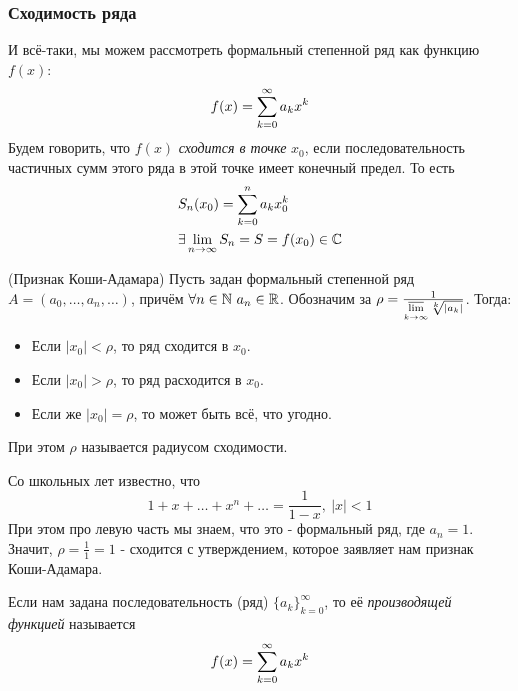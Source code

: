 \subsubsection*{Сходимость ряда}

\begin{definition}
	И всё-таки, мы можем рассмотреть формальный степенной ряд как функцию $f(x)$:
	\[
		f(x) = \sum\limits_{k = 0}^\infty a_k x^k
	\]
	Будем говорить, что $f(x)$ \textit{сходится в точке} $x_0$, если последовательность частичных сумм этого ряда в этой точке имеет конечный предел. То есть
	\begin{align*}
		&{S_n(x_0) = \sum\limits_{k = 0}^n a_k x_0^k}
		\\
		&{\exists \lim\limits_{n \to \infty} S_n = S = f(x_0) \in \mathbb{C}}
	\end{align*}
\end{definition}

\begin{theorem} (Признак Коши-Адамара)
	Пусть задан формальный степенной ряд $A = (a_0, \ldots, a_n, \ldots)$, причём $\forall n \in \mathbb{N}\ a_n \in \mathbb{R}$. Обозначим за $\rho = \frac{1}{\varlimsup\limits_{k \to \infty} \sqrt[k]{|a_k|}}$. Тогда:
	\begin{itemize}
		\item Если $|x_0| < \rho$, то ряд сходится в $x_0$.
		
		\item Если $|x_0| > \rho$, то ряд расходится в $x_0$.
		
		\item Если же $|x_0| = \rho$, то может быть всё, что угодно.
	\end{itemize}
	При этом $\rho$ называется радиусом сходимости.
\end{theorem}

\begin{example}
	Со школьных лет известно, что
	\[
		1 + x + \ldots + x^n + \ldots = \frac{1}{1 - x},\ |x| < 1
	\]
	При этом про левую часть мы знаем, что это - формальный ряд, где $a_n = 1$. Значит, $\rho = \frac{1}{1} = 1$ - сходится с утверждением, которое заявляет нам признак Коши-Адамара.
\end{example}

\begin{definition}
	Если нам задана последовательность (ряд) $\{a_k\}_{k = 0}^\infty$, то её \textit{производящей функцией} называется
	\[
		f(x) = \sum\limits_{k = 0}^\infty a_k x^k
	\]
\end{definition}

